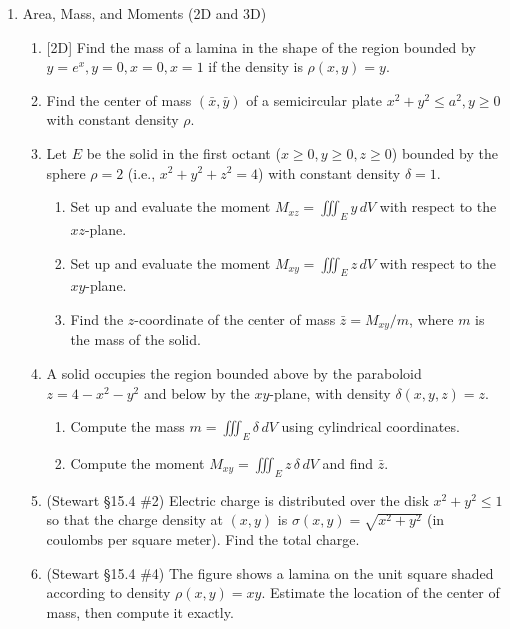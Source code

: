 \documentclass[12pt]{article}
\newcommand{\dimtag}[1]{{\footnotesize\textsc{[#1]}}\;}
\begin{document}
\begin{enumerate}
\item Area, Mass, and Moments (2D and 3D)
    \begin{enumerate}
        \item \dimtag{2D} Find the mass of a lamina in the shape of the region bounded by $y = e^x, y=0, x=0, x=1$ if the density is $\rho(x,y) = y$.
        \item Find the center of mass $(\bar{x}, \bar{y})$ of a semicircular plate $x^2 + y^2 \leq a^2, y \geq 0$ with constant density $\rho$.
        \item Let $E$ be the solid in the first octant ($x \geq 0, y \geq 0, z \geq 0$) bounded by the sphere $\rho = 2$ (i.e., $x^2+y^2+z^2 = 4$) with constant density $\delta = 1$.
        \begin{enumerate}
            \item Set up and evaluate the moment $M_{xz} = \iiint_E y \, dV$ with respect to the $xz$-plane.
            \item Set up and evaluate the moment $M_{xy} = \iiint_E z \, dV$ with respect to the $xy$-plane.
            \item Find the $z$-coordinate of the center of mass $\bar{z} = M_{xy}/m$, where $m$ is the mass of the solid.
        \end{enumerate}
        \item A solid occupies the region bounded above by the paraboloid $z = 4 - x^2 - y^2$ and below by the $xy$-plane, with density $\delta(x,y,z) = z$.
        \begin{enumerate}
            \item Compute the mass $m = \iiint_E \delta \, dV$ using cylindrical coordinates.
            \item Compute the moment $M_{xy} = \iiint_E z\,\delta \, dV$ and find $\bar{z}$.
        \end{enumerate}
        \item (Stewart \S15.4 \#2) Electric charge is distributed over the disk $x^2+y^2\leq 1$ so that the charge density at $(x,y)$ is $\sigma(x,y) = \sqrt{x^2+y^2}$ (in coulombs per square meter). Find the total charge.
        \item (Stewart \S15.4 \#4) The figure shows a lamina on the unit square shaded according to density $\rho(x,y) = xy$. Estimate the location of the center of mass, then compute it exactly.
        \begin{center}
\end{center}
\end{enumerate}
\end{enumerate}
\end{document}
